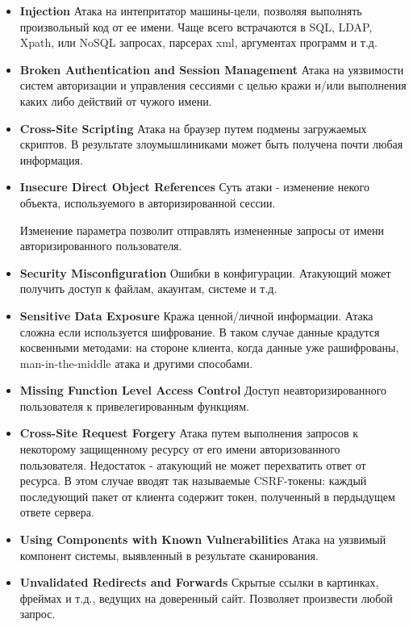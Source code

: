 \documentclass[10pt,a4paper]{article}
\begin{document}
\begin{itemize}

\item {\textbf{Injection} Атака на интепритатор машины-цели, позволяя выполнять произвольный код от ее имени. Чаще всего встрачаются в SQL, LDAP, Xpath, или NoSQL запросах, парсерах xml, аргументах программ и т.д.}
\item {\textbf{Broken Authentication and Session Management} Атака на уязвимости систем авторизации и управления сессиями с целью кражи и/или выполнения каких либо действий от чужого имени.}

\item {\textbf{Cross-Site Scripting} Атака на браузер путем подмены загружаемых скриптов. В результате злоумышлиниками может быть получена почти любая информация.}

\item {\textbf{Insecure Direct Object References} Суть атаки - изменение некого объекта, используемого в авторизированной сессии.

Изменение параметра позволит отправлять измененные запросы от имени авторизированного пользователя.}

\item {\textbf{Security Misconfiguration} Ошибки в конфигурации. Атакующий может получить доступ к файлам, акаунтам, системе и т.д.}

\item {\textbf{Sensitive Data Exposure} Кража ценной/личной информации. Атака сложна если используется шифрование. В таком случае данные крадутся косвенными методами: на стороне клиента, когда данные уже рашифрованы, man-in-the-middle атака и другими способами.}

\item {\textbf{Missing Function Level Access Control} Доступ неавторизированного пользователя к привелегированным функциям. }


\item {\textbf{Cross-Site Request Forgery} Атака путем выполнения запросов к некоторому защищенному ресурсу от его имени авторизованного пользователя. Недостаток - атакующий не может перехватить ответ от ресурса. В этом случае вводят так называемые CSRF-токены: каждый последующий пакет от клиента содержит токен, полученный в пердыдущем ответе сервера.}

\item {\textbf{Using Components with Known Vulnerabilities} Атака на уязвимый компонент системы, выявленный в результате сканирования.}

\item {\textbf{Unvalidated Redirects and Forwards} Скрытые ссылки в картинках, фреймах и т.д., ведущих на доверенный сайт. Позволяет произвести любой запрос.}

\end{itemize}
\end{document}
